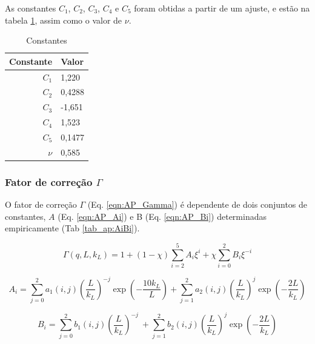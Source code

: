 \begin{apendicesenv}
As constantes \(C_1\), \(C_2\), \(C_3\), \(C_4\) e \(C_5\) foram obtidas a partir de um ajuste, e estão na tabela \ref{tab_ap:C1C5}, assim como o valor de \(\nu\).
\begin{table}
    \IBGEtab%
    {\caption{Constantes}
    \label{tab_ap:C1C5} }%
    {\begin{tabular}{r p{2cm}}
      \toprule
      Constante 	& Valor \\
      \midrule
      \(C_1\)			&  1,220	\\
      \(C_2\)			&  0,4288	\\
      \(C_3\)			&  -1,651	\\
      \(C_4\)			&  1,523	\\
      \(C_5\)			&  0,1477 	\\	
      \(\nu\)			&  0,585	\\					
      \bottomrule
    \end{tabular}}%
    {}%
\end{table}


\subsubsection{Fator de correção \(\Gamma\)}

O fator de correção \(\Gamma\) (Eq. \ref{eqn:AP_Gamma}) é dependente de dois conjuntos de constantes, \(A\) (Eq. \ref{eqn:AP_Ai}) e B (Eq. \ref{eqn:AP_Bi}) determinadas empiricamente (Tab \ref{tab_ap:AiBi}).

\begin{equation}
\Gamma\left( q,L,k_{L} \right) = 1 + \left( 1 - \chi \right)\sum_{i = 2}^{5}{A_{i}\xi^{i}} + \chi\sum_{i = 0}^{2}{B_{i}\xi^{- i}}
\label{eqn:AP_Gamma}
\end{equation}

\begin{equation}
A_{i} = \sum_{j = 0}^{2}{a_{1}\left( i,j \right)\left( \frac{L}{k_{L}} \right)^{- j}\exp\left( - \frac{10k_{L}}{L} \right)} + \sum_{j = 1}^{2}{a_{2}\left( i,j \right)\left( \frac{L}{k_{L}} \right)^{j}\exp\left( - \frac{2L}{k_{L}} \right)}
\label{eqn:AP_Ai}
\end{equation}

\begin{equation}
B_{i} = \sum_{j = 0}^{2}{b_{1}\left( i,j \right)\left( \frac{L}{k_{L}} \right)^{- j}\ } + \sum_{j = 1}^{2}{b_{2}\left( i,j \right)\left( \frac{L}{k_{L}} \right)^{j}\exp\left( - \frac{2L}{k_{L}} \right)}
\label{eqn:AP_Bi}
\end{equation}


\end{apendicesenv}
